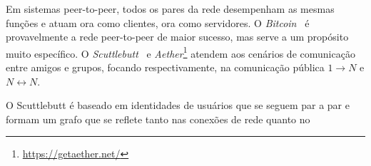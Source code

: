 \documentclass[12pt]{article}
\newcommand{\FC} {Freechains\xspace}
\newcommand{\Xon} {$1{\rightarrow}N$\xspace}
\newcommand{\Xnn} {$N{\leftrightarrow}N$\xspace}
\begin{document}
Em sistemas peer-to-peer, todos os pares da rede desempenham as mesmas funções
e atuam ora como clientes, ora como servidores.
O \emph{Bitcoin}~\cite{p2p.bitcoin} é provavelmente a rede peer-to-peer de
maior sucesso, mas serve a um propósito muito específico.
O \emph{Scuttlebutt}~\cite{p2p.scuttlebutt} e
\emph{Aether}\footnote{\url{https://getaether.net/}} atendem aos cenários de
comunicação entre amigos e grupos, focando respectivamente, na comunicação
pública \Xon e \Xnn.

O Scuttlebutt é baseado em identidades de usuários que se seguem par a par e
formam um grafo que se reflete tanto nas conexões de rede quanto no
\end{document}
